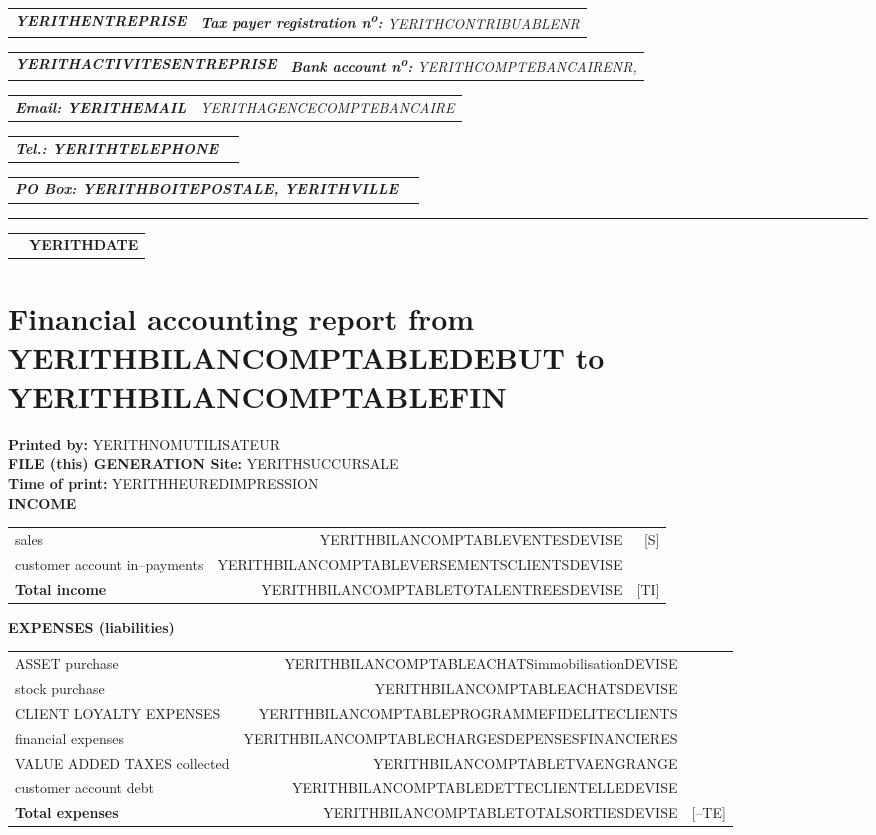 \documentclass[10pt,YERITHPAPERSPEC,landscape]{article} %
\makeatletter
\newcommand{\headerrow}[2]
{\begin{tabular*}{\linewidth}{l@{\extracolsep{\fill}}r}
	#1 &
	#2 \\
\end{tabular*}}
\newcommand{\emphbold}[1]{\textbf{\emph{#1}}\xspace}
\makeatother
\begin{document}
\bigskip

\headerrow
	{\emphbold{YERITHENTREPRISE}}
	{\emph{\textbf{Tax payer registration n\textsuperscript{o}:} YERITHCONTRIBUABLENR}}
\headerrow
	{\emphbold{YERITHACTIVITESENTREPRISE}}
	{\emph{\textbf{Bank account n\textsuperscript{o}:} YERITHCOMPTEBANCAIRENR,}}
\headerrow
	{\emphbold{Email: YERITHEMAIL}}
	{\emph{YERITHAGENCECOMPTEBANCAIRE}}
\headerrow
	{\emphbold{Tel.: YERITHTELEPHONE}}
	{}
\headerrow
	{\emphbold{PO Box: YERITHBOITEPOSTALE, YERITHVILLE}}
	{}
	
\hrule

\headerrow
	{}
	{\textbf{YERITHDATE}}

\section*{Financial accounting report from YERITHBILANCOMPTABLEDEBUT to YERITHBILANCOMPTABLEFIN}

\textbf{Printed by:} YERITHNOMUTILISATEUR\\
\textbf{FILE (this) GENERATION Site:} YERITHSUCCURSALE\\
\textbf{Time of print:} YERITHHEUREDIMPRESSION\\


\vspace*{0.15em}
\textbf{INCOME}
\begin{table}[!htbp]
\begin{tabular}{lrr}
sales  				&  YERITHBILANCOMPTABLEVENTESDEVISE  			& [S] \\ 
customer account in--payments  	&  YERITHBILANCOMPTABLEVERSEMENTSCLIENTSDEVISE  & \\ \hline
\textbf{Total income}  		&  YERITHBILANCOMPTABLETOTALENTREESDEVISE & [TI] \\	 
\end{tabular}
\end{table}


\vspace*{0.15em}
\textbf{EXPENSES (liabilities)}
\begin{table}[!htbp]
\begin{tabular}{lrr}
ASSET purchase 				&  YERITHBILANCOMPTABLEACHATSimmobilisationDEVISE			& \\
stock purchase 				&  YERITHBILANCOMPTABLEACHATSDEVISE  						& \\ 
CLIENT LOYALTY EXPENSES 		&  YERITHBILANCOMPTABLEPROGRAMMEFIDELITECLIENTS  			& \\ 
financial expenses 			&  YERITHBILANCOMPTABLECHARGESDEPENSESFINANCIERES  			& \\ 
VALUE ADDED TAXES collected	&  YERITHBILANCOMPTABLETVAENGRANGE 							&  \\
customer account debt\footnotemark  		&  YERITHBILANCOMPTABLEDETTECLIENTELLEDEVISE 	&  \\ \hline
\textbf{Total expenses}  	&  YERITHBILANCOMPTABLETOTALSORTIESDEVISE & [--TE] \\
\end{tabular}
\end{table}
\end{document}
